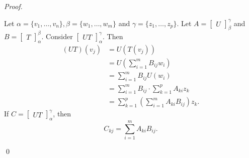 \documentclass[12pt]{article}
\newenvironment{sol}
    {\emph{Proof.}
    }
    {
    \qed
    }
\begin{document}
\begin{sol}
Let $\alpha = \{v_1, \dots, v_n\}, \beta = \{w_1, \dots, w_m\}$ and $\gamma = \{z_1, \dots, z_p\}$. Let $A = \begin{bmatrix}
U
\end{bmatrix}_\beta^\gamma$ and $B = \begin{bmatrix}
T
\end{bmatrix}_\alpha^\beta$. Consider $\begin{bmatrix}
UT
\end{bmatrix}_\alpha^\gamma$. Then
\begin{align*}
    (UT)(v_j) &= U(T(v_j)) \\
    &= U\left(\sum_{i = 1}^mB_{ij}w_i\right) \\
    &= \sum_{i = 1}^mB_{ij}U(w_i) \\
    &= \sum_{i = 1}^mB_{ij}\cdot \sum_{k = 1}^pA_{ki}z_k \\
    &= \sum_{k = 1}^p\left(\sum_{i = 1}^mA_{ki}B_{ij}\right)z_k.
\end{align*} 
If $C = \begin{bmatrix}
UT
\end{bmatrix}_\alpha^\gamma$, then $$C_{kj} = \sum_{i = 1}^mA_{ki}B_{ij}.$$
\end{sol}
\end{document}
